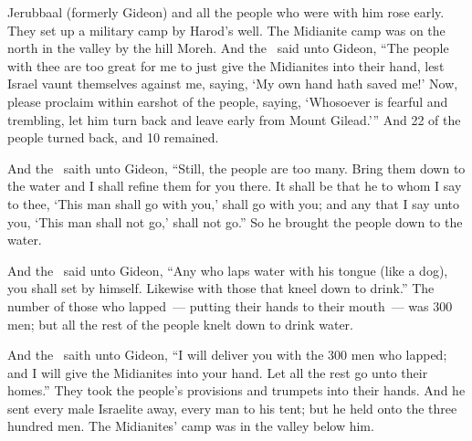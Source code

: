 
\begin{inparaenum}
   Jerubbaal (formerly Gideon) and all the people who were with him rose early. They set up a military camp by Harod's well. The Midianite camp was on the north in the valley by the hill Moreh.%
   And the \lord\ said unto Gideon, ``The people with thee are too great for me to just give the Midianites into their hand, lest Israel vaunt themselves against me, saying, `My own hand hath saved me!'%
   Now, please proclaim within earshot of the people, saying, `Whosoever is fearful and trembling, let him turn back and leave early from Mount Gilead.'\thinspace'' And 22 of the people turned back, and 10 remained.%

   And the \lord\ saith unto Gideon, ``Still, the people are too many. Bring them down to the water and I shall refine them for you there. It shall be that he to whom I say to thee, `This man shall go with you,' shall go with you; and any that I say unto you, `This man shall not go,' shall not go.''%
   So he brought the people down to the water.%

  And the \lord\ said unto Gideon, ``Any who laps water with his tongue (like a dog), you shall set by himself. Likewise with those that kneel down to drink.''%
   The number of those who lapped~--- putting their hands to their mouth~--- was 300 men; but all the rest of the people knelt down to drink water.%

   And the \lord\ saith unto Gideon, ``I will deliver you with the 300 men who lapped; and I will give the Midianites into your hand. Let all the rest go unto their homes.''%
   They took the people's provisions and trumpets into their hands. And he sent every male Israelite away, every man to his tent; but he held onto the three hundred men. The Midianites' camp was in the valley below him.%


\end{inparaenum}

